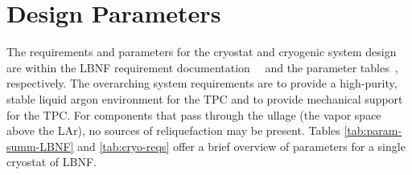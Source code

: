 \section{Design Parameters}
\label{sec:cryo-cryosys-params}

The requirements and parameters for the cryostat and cryogenic system 
design are within the LBNF requirement documentation~\cite{lar-fd-req}~\cite{lar-fd-req-traceback}  
and the parameter tables~\cite{lar-fd-params}, respectively. The 
overarching system requirements are to provide a high-purity, 
stable liquid argon environment for the TPC and to provide 
mechanical support for the TPC. For components that pass 
through the ullage (the vapor space above the LAr), no 
sources of reliquefaction may be present. Tables 
\ref{tab:param-summ-LBNF} and \ref{tab:cryo-reqs} 
offer a brief overview of parameters for a single 
cryostat of LBNF.

